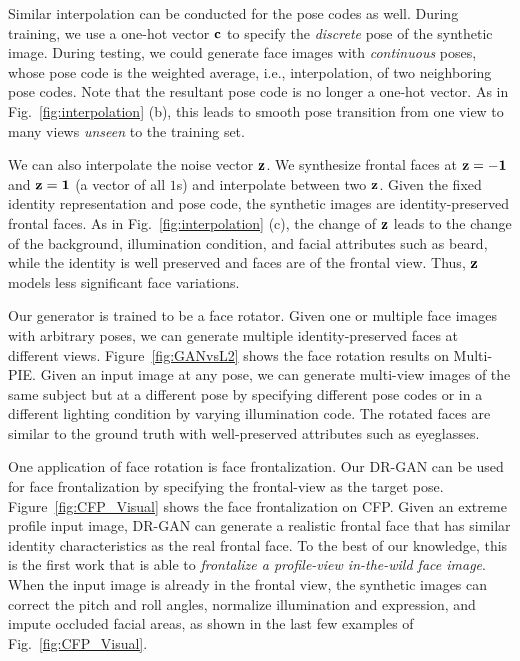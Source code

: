 \documentclass[10pt,journal,compsoc]{IEEEtran}
\begin{document}
Similar interpolation can be conducted for the pose codes as well.
During training, we use a one-hot vector $\bf{c}$ to specify the {\it discrete} pose of the synthetic image. 
During testing, we could generate face images with {\it continuous} poses, whose pose code is the weighted average, i.e., interpolation, of two neighboring pose codes. 
Note that the resultant pose code is no longer a one-hot vector. 
As in Fig.~\ref{fig:interpolation} (b), this leads to smooth pose transition from one view to many views {\it unseen} to the training set.

We can also interpolate the noise vector $\bf{z}$.
We synthesize frontal faces at ${\bf{z}}=-{\bf{1}}$ and ${\bf{z}}={\bf{1}}$ (a vector of all $1$s) and interpolate between two ${\bf{z}}$.
Given the fixed identity representation and pose code, the synthetic images are identity-preserved frontal faces. 
As in Fig.~\ref{fig:interpolation} (c), the change of $\bf{z}$ leads to the change of the background, illumination condition, and facial attributes such as beard, while the identity is well preserved and faces are of the frontal view. 
Thus, $\bf{z}$ models less significant face variations. 

Our generator is trained to be a face rotator.
Given one or multiple face images with arbitrary poses, we can generate multiple identity-preserved faces at different views. 
Figure~\ref{fig:GANvsL2} shows the face rotation results on Multi-PIE. 
Given an input image at any pose, we can generate multi-view images of the same subject but at a different pose by specifying different pose codes or in a different lighting condition by varying illumination code. 
The rotated faces are similar to the ground truth with well-preserved attributes such as eyeglasses. 

One application of face rotation is face frontalization. 
Our DR-GAN can be used for face frontalization by specifying the frontal-view as the target pose. 
Figure~\ref{fig:CFP_Visual} shows the face frontalization on CFP. 
Given an extreme profile input image, DR-GAN can generate a realistic frontal face that has similar identity characteristics as the real frontal face.
To the best of our knowledge, this is the first work that is able to {\it frontalize a profile-view in-the-wild face image}. 
When the input image is already in the frontal view, the synthetic images can correct the pitch and roll angles, normalize illumination and expression, and impute occluded facial areas, as shown in the last few examples of Fig.~\ref{fig:CFP_Visual}.
\end{document}
